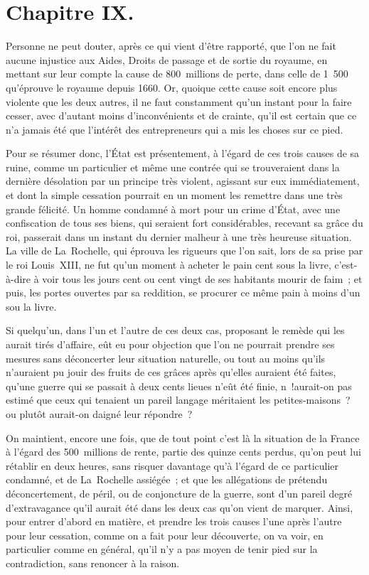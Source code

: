 \documentclass[french,twoside]{book} %
\begin{document}
\section[{Chapitre IX.}]{Chapitre IX.}
\noindent Personne ne peut douter, après ce qui vient d’être rapporté, que l’on ne fait aucune injustice aux Aides, Droits de passage et de sortie du royaume, en mettant sur leur compte la cause de 800 millions de perte, dans celle de 1 500 qu’éprouve le royaume depuis 1660. Or, quoique cette cause soit encore plus violente que les deux autres, il ne faut constamment qu’un instant pour la faire cesser, avec d’autant moins d’inconvénients et de crainte, qu’il est certain que ce n’a jamais été que l’intérêt des entrepreneurs qui a mis les choses sur ce pied.\par
Pour se résumer donc, l’État est présentement, à l’égard de ces trois causes de sa ruine, comme un particulier et même une contrée qui se trouveraient dans la dernière désolation par un principe très violent, agissant sur eux immédiatement, et dont la simple cessation pourrait en un moment les remettre dans une très grande félicité. Un homme condamné à mort pour un crime d’État, avec une confiscation de tous ses biens, qui seraient fort considérables, recevant sa grâce du roi, passerait dans un instant du dernier malheur à une très heureuse situation. La ville de La Rochelle, qui éprouva les rigueurs que l’on sait, lors de sa prise par le roi Louis XIII, ne fut qu’un moment à acheter le pain cent sous la livre, c’est-à-dire à voir tous les jours cent ou cent vingt de ses habitants mourir de faim ; et puis, les portes ouvertes par sa reddition, se procurer ce même pain à moins d’un sou la livre.\par
Si quelqu’un, dans l’un et l’autre de ces deux cas, proposant le remède qui les aurait tirés d’affaire, eût eu pour objection que l’on ne pourrait prendre ses mesures sans déconcerter leur situation naturelle, ou tout au moins qu’ils n’auraient pu jouir des fruits de ces grâces après qu’elles auraient été faites, qu’une guerre qui se passait à deux cents lieues n’eût été finie, n \textsuperscript{}!aurait-on pas estimé que ceux qui tenaient un pareil langage méritaient les petites-maisons ? ou plutôt aurait-on daigné leur répondre ?\par
On maintient, encore une fois, que de tout point c’est là la situation de la France à l’égard des 500 millions de rente, partie des quinze cents perdus, qu’on peut lui rétablir en deux heures, sans risquer davantage qu’à l’égard de ce particulier condamné, et de La Rochelle assiégée ; et que les allégations de prétendu déconcertement, de péril, ou de conjoncture de la guerre, sont d’un pareil degré d’extravagance qu’il aurait été dans les deux cas qu’on vient de marquer. Ainsi, pour entrer d’abord en matière, et prendre les trois causes l’une après l’autre pour leur cessation, comme on a fait pour leur découverte, on va voir, en particulier comme en général, qu’il n’y a pas moyen de tenir pied sur la contradiction, sans renoncer à la raison.\par
\end{document}
